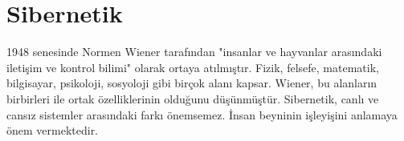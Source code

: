 \section{Sibernetik}
1948 senesinde Normen Wiener tarafından "insanlar ve hayvanlar arasındaki iletişim ve kontrol bilimi" olarak ortaya atılmıştır. Fizik, felsefe, matematik, bilgisayar, psikoloji, sosyoloji gibi birçok alanı kapsar. Wiener, bu alanların birbirleri ile ortak özelliklerinin olduğunu düşünmüştür. Sibernetik, canlı ve cansız sistemler arasındaki farkı önemsemez. İnsan beyninin işleyişini anlamaya önem vermektedir.

\newpage